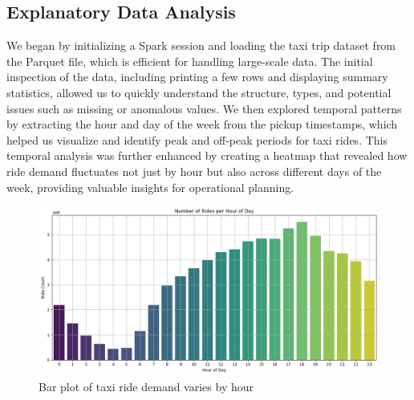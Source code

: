 \documentclass[conference]{IEEEtran}
\begin{document}
\begin{table}[htbp]
\caption{Risk Assessment and Mitigation Strategies}
\centering
{}
\label{table:risk}
\end{table}

\subsection{Explanatory Data Analysis}
We began by initializing a Spark session and loading the taxi trip dataset from the Parquet file, which is efficient for handling large-scale data. The initial inspection of the data, including printing a few rows and displaying summary statistics, allowed us to quickly understand the structure, types, and potential issues such as missing or anomalous values. We then explored temporal patterns by extracting the hour and day of the week from the pickup timestamps, which helped us visualize and identify peak and off-peak periods for taxi rides. This temporal analysis was further enhanced by creating a heatmap that revealed how ride demand fluctuates not just by hour but also across different days of the week, providing valuable insights for operational planning.

\begin{figure}[h]
  \includegraphics[width=\linewidth]{eda-bar-chart.png}
  \centering
  \caption{Bar plot of taxi ride demand varies by hour}
\end{figure}
\end{document}
